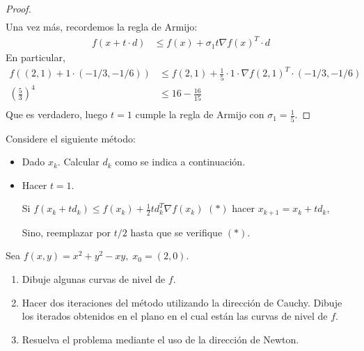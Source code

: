 \documentclass{article}
\newenvironment{theorem}[2][Ejercicio]{\begin{trivlist}
\item[\hskip \labelsep {\bfseries #1}\hskip \labelsep {\bfseries #2.}]}{\end{trivlist}}
\begin{document}
\begin{proof}
\begin{align*}
    \end{align*}
    Una vez más, recordemos la regla de Armijo: \begin{align*}
        f(x + t \cdot d) & \leq f(x) + \sigma_1 t {\nabla f(x)}^T \cdot d
    \end{align*}
    En particular,\begin{align*}
        f((2,1) + 1 \cdot (-1/3, -1/6)) & \leq f(2, 1) + \frac{1}{5} \cdot 1 \cdot {\nabla f(2,1)}^T \cdot (-1/3, -1/6) \\
        {\left (\frac{5}{3} \right)}^4  & \leq 16 - \frac{16}{15}                                                       \\
    \end{align*}
    Que es verdadero, luego \( t = 1 \) cumple la regla de Armijo con \( \sigma_1 = \frac{1}{5} \).
\end{proof}
\vspace{0.25in}

\begin{theorem}{6}
    Considere el siguiente método:
    \begin{itemize}
        \item Dado \(x_k\). Calcular \(d_k\) como se indica a continuación.
        \item Hacer \(t = 1\).

              Si \( f(x_k + t d_k) \leq f(x_k) + \tfrac{1}{2} t d_k^T \nabla f(x_k) \) \((*)\) hacer
              \( x_{k+1} = x_k + t d_k \),

              Sino, reemplazar por \(t/2\) hasta que se verifique \((*)\).
    \end{itemize}

    Sea \( f(x,y) = x^2 + y^2 - xy, \; x_0 = (2,0) \).
    \begin{enumerate}
        \item[(a)] Dibuje algunas curvas de nivel de \(f\).
        \item[(b)] Hacer dos iteraciones del método utilizando la dirección de Cauchy. Dibuje los iterados obtenidos en el plano en el cual están las curvas de nivel de \(f\).
        \item[(c)] Resuelva el problema mediante el uso de la dirección de Newton.
    \end{enumerate}
\end{theorem}
\end{document}
